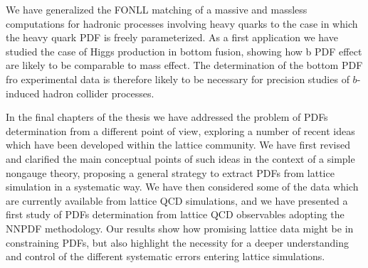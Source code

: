 %
We have generalized the FONLL matching of a massive and massless computations for hadronic processes
involving heavy quarks to the case in which the heavy quark PDF is freely parameterized. 
As a first application we have studied the case of Higgs production in bottom fusion, showing how b PDF effect are likely
to be comparable to mass effect. The determination of the bottom PDF fro experimental data is therefore likely to be 
necessary for precision studies of $b$-induced hadron collider processes.

%
In the final chapters of the thesis we have addressed the problem of PDFs determination from a different point of view,
exploring a number of recent ideas which have been developed within the lattice community.
We have first revised and clarified the main conceptual points of such ideas in the context of a simple nongauge theory,
proposing a general strategy to extract PDFs from lattice simulation in a systematic way.
We have then considered some of the data which are currently available from lattice QCD simulations, and we have presented
a first study of PDFs determination from lattice QCD observables adopting the NNPDF methodology.
Our results show how promising lattice data might be in constraining PDFs, but also highlight the necessity for a deeper
understanding and control of the different systematic errors entering lattice simulations.

